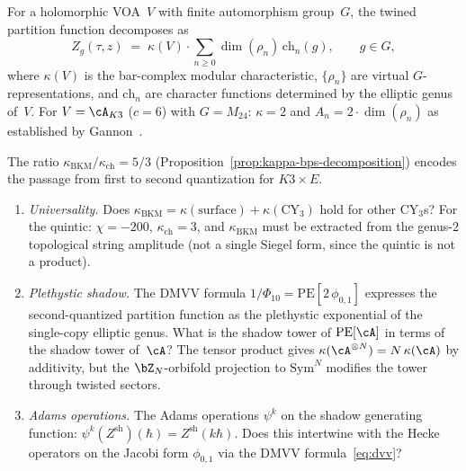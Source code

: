 \begin{conjecture}
\label{conj:universal-moonshine-multiplier}
\ClaimStatusConjectured\quad
For a holomorphic VOA~$V$ with finite automorphism group~$G$,
the twined partition function decomposes as
\[
Z_g(\tau,z)
\;=\;
\kappa(V) \cdot \sum_{n \geq 0}
\dim(\rho_n)\,\mathrm{ch}_n(g),
\qquad g \in G,
\]
where $\kappa(V)$ is the bar-complex modular characteristic,
$\{\rho_n\}$ are virtual $G$-representations, and
$\mathrm{ch}_n$ are character functions determined by the
elliptic genus of~$V$. For $V = \cA_{K3}$ ($c = 6$) with
$G = M_{24}$: $\kappa = 2$ and
$A_n = 2 \cdot \dim(\rho_n)$ as established by Gannon~\cite{Gannon16}.
\end{conjecture}



\begin{openproblem}
\label{op:programme-c-second-quantization}
The ratio $\kappa_{\mathrm{BKM}}/\kappa_{\mathrm{ch}} = 5/3$
(Proposition~\ref{prop:kappa-bps-decomposition}) encodes the
passage from first to second quantization for $K3 \times E$.
\begin{enumerate}[label=\textup{(C\arabic*)}]
\item \emph{Universality.} Does $\kappa_{\mathrm{BKM}}
 = \kappa(\text{surface}) + \kappa(\text{CY}_3)$ hold for
 other CY$_3$s? For the quintic: $\chi = -200$,
 $\kappa_{\mathrm{ch}} = 3$, and
 $\kappa_{\mathrm{BKM}}$ must be extracted from
 the genus-$2$ topological string amplitude (not a single
 Siegel form, since the quintic is not a product).
\item \emph{Plethystic shadow.} The DMVV formula
 $1/\Phi_{10} = \mathrm{PE}[2\,\phi_{0,1}]$ expresses
 the second-quantized partition function as the plethystic
 exponential of the single-copy elliptic genus. What is
 the shadow tower of $\mathrm{PE}[\cA]$ in terms of
 the shadow tower of~$\cA$? The tensor product gives
 $\kappa(\cA^{\otimes N}) = N\,\kappa(\cA)$ by additivity,
 but the $\bZ_N$-orbifold projection to $\mathrm{Sym}^N$
 modifies the tower through twisted sectors.
\item \emph{Adams operations.} The Adams operations
 $\psi^k$ on the shadow generating function:
 $\psi^k(Z^{\mathrm{sh}})(\hbar) = Z^{\mathrm{sh}}(k\hbar)$.
 Does this intertwine with the Hecke operators on the
 Jacobi form $\phi_{0,1}$ via the DMVV
 formula~\eqref{eq:dvv}?
\end{enumerate}
\end{openproblem}

